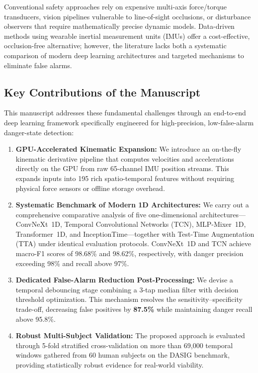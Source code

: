 \documentclass[11pt,a4paper]{article}
\begin{document}
Conventional safety approaches rely on expensive multi-axis force/torque transducers, vision pipelines vulnerable to line-of-sight occlusions, or disturbance observers that require mathematically precise dynamic models. Data-driven methods using wearable inertial measurement units (IMUs) offer a cost-effective, occlusion-free alternative; however, the literature lacks both a systematic comparison of modern deep learning architectures and targeted mechanisms to eliminate false alarms.

\subsection*{Key Contributions of the Manuscript}
This manuscript addresses these fundamental challenges through an end-to-end deep learning framework specifically engineered for high-precision, low-false-alarm danger-state detection:
\begin{enumerate}[leftmargin=*,itemsep=1.5pt,topsep=1.5pt,partopsep=0pt]
    \item \textbf{GPU-Accelerated Kinematic Expansion:} We introduce an on-the-fly kinematic derivative pipeline that computes velocities and accelerations directly on the GPU from raw 65-channel IMU position streams. This expands inputs into 195 rich spatio-temporal features without requiring physical force sensors or offline storage overhead.
    \item \textbf{Systematic Benchmark of Modern 1D Architectures:} We carry out a comprehensive comparative analysis of five one-dimensional architectures—ConvNeXt~1D, Temporal Convolutional Networks (TCN), MLP-Mixer~1D, Transformer~1D, and InceptionTime—together with Test-Time Augmentation (TTA) under identical evaluation protocols. ConvNeXt~1D and TCN achieve macro-F1 scores of 98.68\% and 98.62\%, respectively, with danger precision exceeding 98\% and recall above 97\%.
    \item \textbf{Dedicated False-Alarm Reduction Post-Processing:} We devise a temporal debouncing stage combining a 3-tap median filter with decision threshold optimization. This mechanism resolves the sensitivity--specificity trade-off, decreasing false positives by \textbf{87.5\%} while maintaining danger recall above 95.8\%.
    \item \textbf{Robust Multi-Subject Validation:} The proposed approach is evaluated through 5-fold stratified cross-validation on more than 69,000 temporal windows gathered from 60 human subjects on the DASIG benchmark, providing statistically robust evidence for real-world viability.
\end{enumerate}
\end{document}
